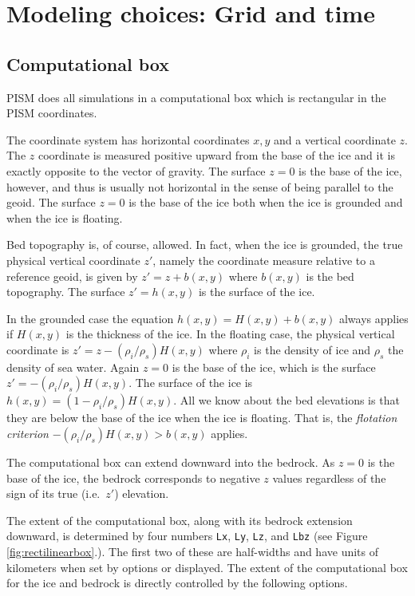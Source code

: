 
\section{Modeling choices: Grid and time}
\label{sec:modeling-computational}

\subsection{Computational box} \label{subsect:coords}

PISM does all simulations in a computational box which is rectangular in the PISM coordinates.

The coordinate system has horizontal coordinates $x,y$ and a vertical coordinate $z$.  The $z$ coordinate is measured positive upward from the base of the ice and it is exactly opposite to the vector of gravity.  The surface $z=0$ is the base of the ice, however, and thus is usually not horizontal in the sense of being parallel to the geoid.   The surface $z=0$ is the base of the ice both when the ice is grounded and when the ice is floating.

Bed topography is, of course, allowed.  In fact, when the ice is grounded, the true physical vertical coordinate $z'$, namely the coordinate measure relative to a reference geoid, is given by $z'=z+b(x,y)$ where $b(x,y)$ is the bed topography.  The surface $z'=h(x,y)$ is the surface of the ice.

In the grounded case the equation $h(x,y)=H(x,y)+b(x,y)$ always applies if $H(x,y)$ is the thickness of the ice.  In the floating case, the physical vertical coordinate is $z'=z-(\rho_i/\rho_s) H(x,y)$ where $\rho_i$ is the density of ice and $\rho_s$ the density of sea water.  Again $z=0$ is the base of the ice, which is the surface $z' = -(\rho_i/\rho_s) H(x,y)$.  The surface of the ice is $h(x,y) = (1-\rho_i/\rho_s) H(x,y)$.  All we know about the bed elevations is that they are below the base of the ice when the ice is floating.  That is, the \emph{flotation criterion} $-(\rho_i/\rho_s) H(x,y) > b(x,y)$ applies.

The computational box can extend downward into the bedrock.  As $z=0$ is the base of the ice, the bedrock corresponds to negative $z$ values regardless of the sign of its true (i.e.~$z'$) elevation.

The extent of the computational box, along with its bedrock extension downward, is determined by four numbers \texttt{Lx}, \texttt{Ly}, \texttt{Lz}, and \texttt{Lbz} (see Figure \ref{fig:rectilinearbox}.).  The first two of these are half-widths and have units of kilometers when set by options or displayed.  The extent of the computational box for the ice and bedrock is directly controlled by the following options. 

